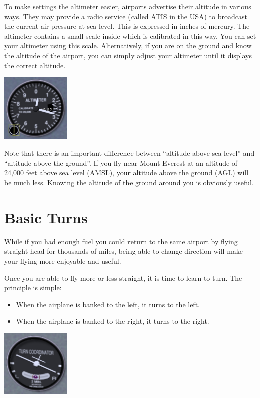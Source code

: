 To make settings the altimeter easier, airports advertise their altitude in 
various ways. They may provide a radio service (called ATIS in the USA) 
to broadcast the current air pressure at sea level. This is expressed in 
inches of mercury. The altimeter contains a small scale inside which is
calibrated in this way. You can set your altimeter using this scale. 
Alternatively, if you are on the ground and know the altitude of the airport,
you can simply adjust your altimeter until it displays the correct altitude.

\begin{center}
\includegraphics[width=0.25\textwidth]{img/tut_18}
\end{center}

Note that there is an important difference between ``altitude above sea 
level'' and ``altitude above the ground''. If you fly near Mount Everest at an
altitude of 24,000 feet above sea level (AMSL), your altitude above the ground 
(AGL) will be much less. Knowing the altitude of the ground around you is 
obviously useful.

\section{Basic Turns}
\label{sec:InFlightTurning}

While if you had enough fuel you could return to the same airport by flying 
straight head for thousands of miles, being able to change direction will
make your flying more enjoyable and useful.

Once you are able to fly more or less straight, it is time to 
learn to turn. The principle is simple: 
\begin{itemize}
	\item When the airplane is banked to the left, it turns to the left.
  \item When the airplane is banked to the right, it turns to the right.
\end{itemize}

\begin{center}
\includegraphics[width=0.25\textwidth]{img/tut_19}
\end{center}

